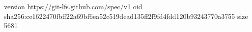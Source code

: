 version https://git-lfs.github.com/spec/v1
oid sha256:ce1622470fbff22a69bf6ea52c519dead135ff2f9fd4fdd120b93243770a3755
size 5681
